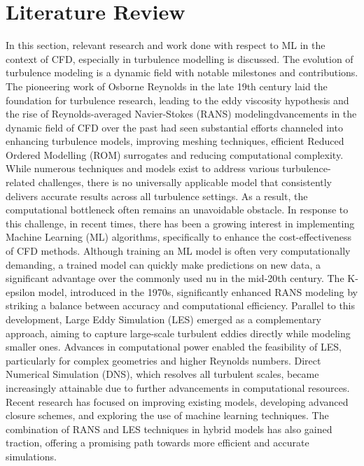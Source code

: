 \section{Literature Review}
In this section, relevant research and work done with respect to ML in the context of CFD, especially in turbulence modelling is discussed. The evolution of turbulence modeling is a dynamic field with notable milestones and contributions. The pioneering work of Osborne Reynolds in the late 19th century laid the foundation for turbulence research, leading to the eddy viscosity hypothesis and the rise of Reynolds-averaged Navier-Stokes (RANS) modelingdvancements in the dynamic field of CFD over the past had seen substantial efforts channeled into enhancing turbulence models, improving meshing techniques, efficient Reduced Ordered Modelling (ROM) surrogates and reducing computational complexity. While numerous techniques and models exist to address various turbulence-related challenges, there is no universally applicable model that consistently delivers accurate results across all turbulence settings. As a result, the computational bottleneck often remains an unavoidable obstacle. In response to this challenge, in recent times, there has been a growing interest in implementing Machine Learning (ML) algorithms, specifically to enhance the cost-effectiveness of CFD methods. Although training an ML model is often very computationally demanding, a trained model can quickly make predictions on new data, a significant advantage over the commonly used nu in the mid-20th century. The K-epsilon model, introduced in the 1970s, significantly enhanced RANS modeling by striking a balance between accuracy and computational efficiency. Parallel to this development, Large Eddy Simulation (LES) emerged as a complementary approach, aiming to capture large-scale turbulent eddies directly while modeling smaller ones. Advances in computational power enabled the feasibility of LES, particularly for complex geometries and higher Reynolds numbers. Direct Numerical Simulation (DNS), which resolves all turbulent scales, became increasingly attainable due to further advancements in computational resources. Recent research has focused on improving existing models, developing advanced closure schemes, and exploring the use of machine learning techniques. The combination of RANS and LES techniques in hybrid models has also gained traction, offering a promising path towards more efficient and accurate simulations. \\
